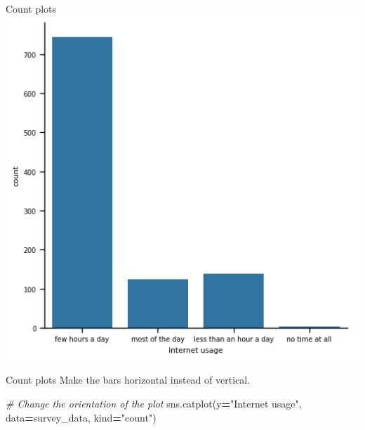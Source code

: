 \documentclass[
  ignorenonframetext,
]{beamer}
\newenvironment{Shaded}{\begin{snugshade}}{\end{snugshade}}
\newcommand{\CommentTok}[1]{\textcolor[rgb]{0.56,0.35,0.01}{\textit{#1}}}
\newcommand{\NormalTok}[1]{#1}
\newcommand{\OperatorTok}[1]{\textcolor[rgb]{0.81,0.36,0.00}{\textbf{#1}}}
\newcommand{\StringTok}[1]{\textcolor[rgb]{0.31,0.60,0.02}{#1}}
\begin{document}
\begin{frame}{Count plots}
\label{count-plots-4}
\includegraphics{../images/im278.png}
\end{frame}

\begin{frame}[fragile]{Count plots}
\label{count-plots-5}
Make the bars horizontal instead of vertical.


\begin{Shaded}
\begin{Highlighting}[]
\CommentTok{\# Change the orientation of the plot}
\NormalTok{sns.catplot(y}\OperatorTok{=}\StringTok{"Internet usage"}\NormalTok{, data}\OperatorTok{=}\NormalTok{survey\_data,}
\NormalTok{            kind}\OperatorTok{=}\StringTok{"count"}\NormalTok{)}
\end{Highlighting}
\end{Shaded}
\end{frame}
\end{document}
